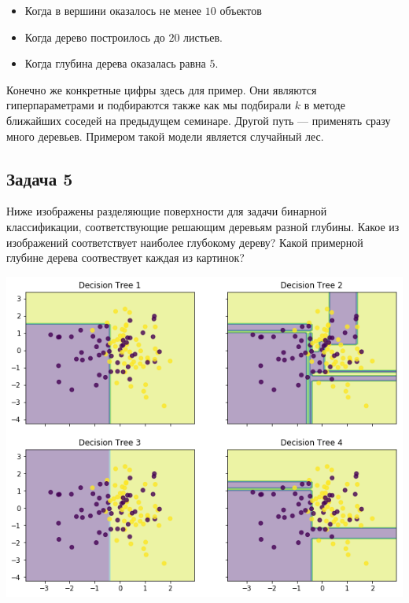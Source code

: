 \documentclass[12pt, a4paper, oneside]{article}
\begin{document}
{	\begin{itemize} 
		\item  Когда в вершини оказалось не менее $10$ объектов
		\item  Когда дерево построилось до $20$ листьев. 	
		\item  Когда глубина дерева оказалась равна $5$.
	\end{itemize}
	
	Конечно же конкретные цифры здесь для пример. Они являются гиперпараметрами и подбираются также как мы подбирали $k$ в методе ближайших соседей на предыдущем семинаре. Другой путь --- применять сразу много деревьев. Примером такой модели является случайный лес.  
}


\subsection*{Задача 5} 

Ниже изображены разделяющие поверхности для задачи бинарной классификации, соответствующие решающим деревьям разной глубины. Какое из изображений соответствует наиболее глубокому дереву? Какой примерной глубине дерева соотвествует каждая из картинок? 

\begin{center}
	\includegraphics[scale=0.6]{trees.png}
\end{center}


\end{document}
